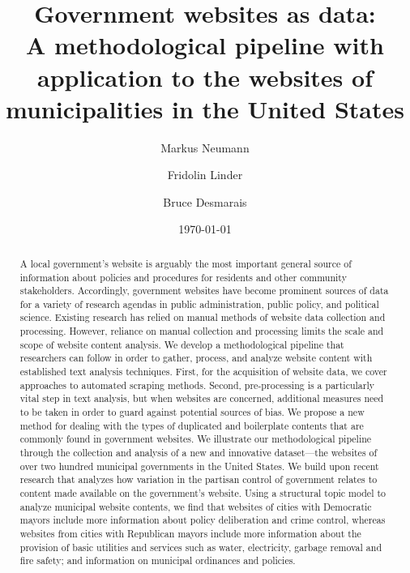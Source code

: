 \documentclass[11pt]{article}
\title{\vspace{-2cm} Government websites as data: \\ A methodological pipeline with application to the websites of municipalities in the United States}
\author{ Markus Neumann \and Fridolin Linder \and Bruce Desmarais} \date{\today}
\begin{document}
\maketitle




\begin{abstract}

A local government's website is arguably the most important general source of information about policies and procedures for residents and other community stakeholders. Accordingly, government websites have become prominent sources of data for a variety of research agendas in public administration, public policy, and political science. Existing research has relied on manual methods of website data collection and processing. However, reliance on manual collection and processing limits the scale and scope of website content analysis. We develop a methodological pipeline that researchers can follow in order to gather, process, and analyze website content with established text analysis techniques. First, for the acquisition of website data, we cover approaches to automated scraping methods. Second, pre-processing is a particularly vital step in text analysis, but when websites are concerned, additional measures need to be taken in order to guard against potential sources of bias. We propose a new method for dealing with the types of duplicated and boilerplate contents that are commonly found in government websites. We illustrate our methodological pipeline through the collection and analysis of a new and innovative dataset---the websites of over two hundred municipal governments in the United States. We build upon recent research that analyzes how variation in the partisan control of government relates to content made available on the government's website. Using a structural topic model to analyze municipal website contents, we find that websites of cities with Democratic mayors include more information about policy deliberation and crime control, whereas websites from cities with Republican mayors include more information about the provision of basic utilities and services such as water, electricity, garbage removal and fire safety; and information on municipal ordinances and policies.

\end{abstract}
\end{document}
